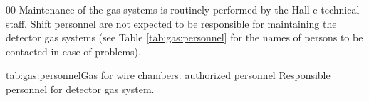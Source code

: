 \begin{safetyen}{0}{0}
Maintenance of the gas systems is routinely performed by the Hall c
technical staff.  Shift personnel are not expected to be responsible
for maintaining the detector gas systems (see Table \ref{tab:gas:personnel}
for the names of persons to be contacted in case of problems).

\begin{namestab}{tab:gas:personnel}{Gas for wire chambers: authorized personnel
}{%
      Responsible personnel for detector gas system.}
\LarsGustavson{}
\WilliamHenry{}
\end{namestab}
\end{safetyen}
